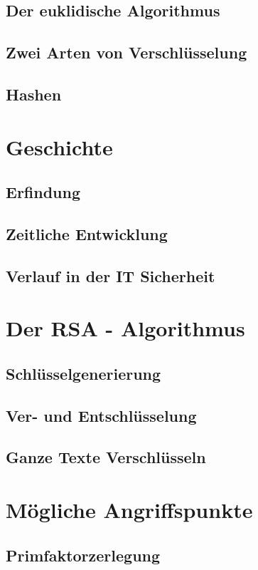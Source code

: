 \documentclass[14pt,a4paper]{scrartcl}
\begin{document}
	\subsection{Der euklidische Algorithmus}
	\subsection{Zwei Arten von Verschlüsselung}
	\subsection{Hashen} %

\section{Geschichte}
	\subsection{Erfindung}
	\subsection{Zeitliche Entwicklung}
	\subsection{Verlauf in der IT Sicherheit}

\section{Der RSA - Algorithmus}
		
	\subsection{Schlüsselgenerierung}
	\subsection{Ver- und Entschlüsselung}
	\subsection{Ganze Texte Verschlüsseln}

\section{Mögliche Angriffspunkte}
	\subsection{Primfaktorzerlegung}
\end{document}
